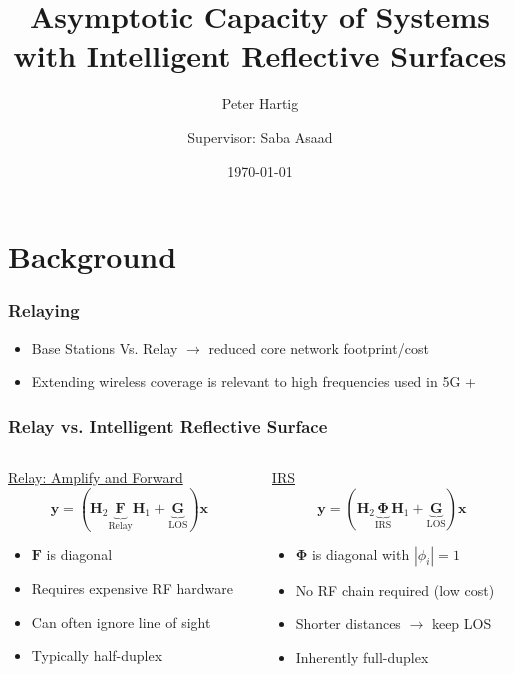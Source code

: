 \documentclass[10pt,tgadventor, onlymath]{beamer}
\title{\large \bfseries Asymptotic Capacity of Systems with Intelligent Reflective Surfaces}
\author{Peter Hartig \\ \and Supervisor: Saba Asaad}
\date{\today}
\begin{document}
\frame{
\thispagestyle{empty}
\titlepage
}

\section{Background}

\begin{frame}
\frametitle{Relaying}

	\begin{itemize}
		\item 			
			Base Stations Vs. Relay $\rightarrow$ reduced core network footprint/cost
		\item 
			Extending wireless coverage is relevant to high frequencies used in 5G +
	\end{itemize}

\end{frame}

\begin{frame}
\frametitle{Relay vs. Intelligent Reflective Surface}
\begin{columns}
\begin{column}{0.5\linewidth}
\centering 
	\underline{Relay: Amplify and Forward}
	\\
	\begin{equation*}
	\mathbf{y} = (\mathbf{H}_2\underbrace{\mathbf{F}}_{\text{Relay}}\mathbf{H}_1 + \underbrace{\mathbf{G}}_{\text{LOS}})\mathbf{x}
	\end{equation*}
	
	\begin{itemize}
	\item 
		$\mathbf{F}$ is diagonal
	\item 
		Requires expensive RF hardware
	\item 
		Can often ignore line of sight
	\item 
		Typically half-duplex
	\end{itemize}
\end{column}
\begin{column}{0.5\linewidth}
\centering 

	\underline{IRS}
	\\
	\begin{equation*}
	\mathbf{y} = (\mathbf{H}_2\underbrace{\boldsymbol{\Phi}}_{\text{IRS}}\mathbf{H}_1 + \underbrace{\mathbf{G}}_{\text{LOS}})\mathbf{x}
	\end{equation*} 
	\begin{itemize}
	\item 
		$\boldsymbol{\Phi}$ is diagonal with $| \phi_i | =1$
	\item 
		No RF chain required (low cost)
	\item
		Shorter distances $\rightarrow$ keep LOS
	\item 
		Inherently full-duplex
	\end{itemize}
\end{column}
\end{columns}

\end{frame}
\end{document}
